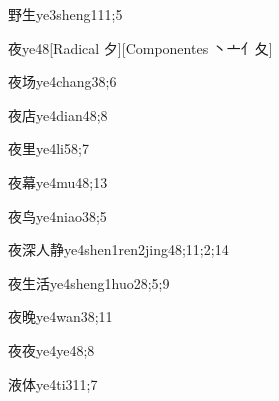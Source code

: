 \begin{verbete}{野生}{ye3sheng1}{11;5}
\end{verbete}

\begin{verbete}{夜}{ye4}{8}[Radical 夕][Componentes 丶亠亻夂]
\end{verbete}

\begin{verbete}{夜场}{ye4chang3}{8;6}
\end{verbete}

\begin{verbete}{夜店}{ye4dian4}{8;8}
\end{verbete}

\begin{verbete}{夜里}{ye4li5}{8;7}
\end{verbete}

\begin{verbete}{夜幕}{ye4mu4}{8;13}
\end{verbete}

\begin{verbete}{夜鸟}{ye4niao3}{8;5}
\end{verbete}

\begin{verbete}{夜深人静}{ye4shen1ren2jing4}{8;11;2;14}
\end{verbete}

\begin{verbete}{夜生活}{ye4sheng1huo2}{8;5;9}
\end{verbete}

\begin{verbete}{夜晚}{ye4wan3}{8;11}
\end{verbete}

\begin{verbete}{夜夜}{ye4ye4}{8;8}
\end{verbete}

\begin{verbete}{液体}{ye4ti3}{11;7}
\end{verbete}

